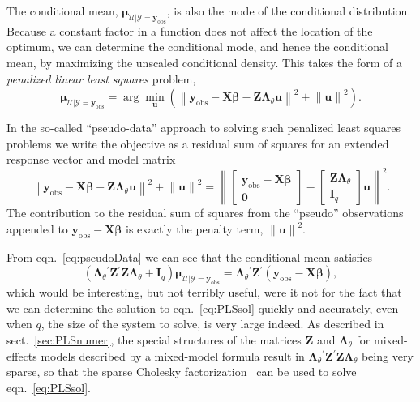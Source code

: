 \documentclass{jss}
\newcommand{\bLt}{\ensuremath{\bm\Lambda_\theta}}
\newcommand{\mc}[1]{\ensuremath{\mathcal{#1}}}
\newcommand{\trans}{\ensuremath{^\prime}}
\newcommand{\yobs}{\ensuremath{\bm y_{\mathrm{obs}}}}
\newcommand*{\eq}[1]{eqn.~\ref{#1}}%
\begin{document}
The conditional mean, $\bm\mu_{\mc U|\mc Y=\yobs}$, is also the mode
of the conditional distribution.  Because a constant factor in a
function does not affect the location of the optimum, we can determine
the conditional mode, and hence the conditional mean, by maximizing
the unscaled conditional density.  This takes the form of a
\emph{penalized linear least squares} problem,%
\begin{equation}
  \label{eq:PLSprob}
  \bm\mu_{\mc U|\mc Y=\yobs}=\arg\min_{\bm u}
  \left(\left\|\yobs-\bm X\bm\beta-\bm Z\bLt\bm u\right\|^2 +
    \left\|\bm u\right\|^2\right) .
\end{equation}%

In the so-called ``pseudo-data'' approach to solving such penalized
least squares problems we write the objective as a residual sum of
squares for an extended response vector and model matrix%
\begin{equation}
  \label{eq:pseudoData}
  \left\|\yobs-\bm X\bm\beta-\bm Z\bLt\bm u\right\|^2 +
  \left\|\bm u\right\|^2 =
  \left\| \begin{bmatrix}\yobs-\bm X\bm\beta\\\bm 0\end{bmatrix}-
    \begin{bmatrix}\bm Z\bLt\\\bm I_q\end{bmatrix}
    \bm u\right\|^2.
\end{equation}%
The contribution to the residual sum of squares from the ``pseudo''
observations appended to $\yobs-\bm X\bm\beta$ is exactly the penalty
term, $\left\|\bm u\right\|^2$.

From \eq{eq:pseudoData} we can see that the conditional mean satisfies%
\begin{equation}
  \label{eq:PLSsol}
  \left(\bLt\trans\bm Z\trans\bm Z\bLt+\bm I_q\right)
  \bm\mu_{\mc U|\mc Y=\yobs}=\bLt\trans\bm Z\trans(\yobs-\bm X\bm\beta),
\end{equation}%
which would be interesting, but not terribly useful, were it not for
the fact that we can determine the solution to \eq{eq:PLSsol} quickly
and accurately, even when $q$, the size of the system to solve, is
very large indeed.  As described in sect.~\ref{sec:PLSnumer}, the
special structures of the matrices $\bm Z$ and $\bLt$ for
mixed-effects models described by a mixed-model formula result in
$\bLt\trans\bm Z\trans\bm Z\bLt$ being very sparse, so that the
sparse Cholesky factorization~\citep[Ch.~4]{davis06:csparse_book} can
be used to solve eqn.~\ref{eq:PLSsol}.
\end{document}
